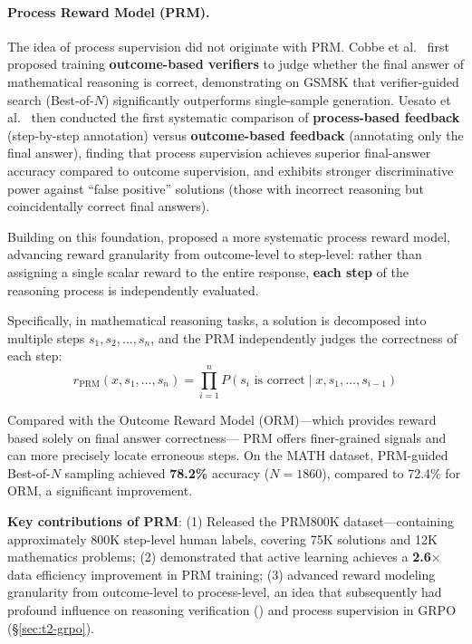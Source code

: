 \paragraph{Process Reward Model (PRM).}
The idea of process supervision did not originate with PRM.
Cobbe et al.\ \cite{cobbe2021gsm8k} first proposed training \textbf{outcome-based verifiers}
to judge whether the final answer of mathematical reasoning is correct, demonstrating on GSM8K that
verifier-guided search (Best-of-$N$) significantly outperforms single-sample generation.
Uesato et al.\ \cite{uesato2022process} then conducted the first systematic comparison of
\textbf{process-based feedback} (step-by-step annotation) versus \textbf{outcome-based feedback} (annotating only the final answer),
finding that process supervision achieves superior final-answer accuracy compared to outcome supervision,
and exhibits stronger discriminative power against ``false positive'' solutions (those with incorrect reasoning but coincidentally correct final answers).

Building on this foundation,  proposed a more systematic process reward model,
advancing reward granularity from outcome-level to step-level:
rather than assigning a single scalar reward to the entire response,
\textbf{each step} of the reasoning process is independently evaluated.

Specifically, in mathematical reasoning tasks,
a solution is decomposed into multiple steps $s_1, s_2, \ldots, s_n$,
and the PRM independently judges the correctness of each step:
\begin{equation}
\label{eq:pref:prm}
r_{\text{PRM}}(x, s_1, \ldots, s_n) = \prod_{i=1}^{n} P(s_i \text{ is correct} \mid x, s_1, \ldots, s_{i-1})
\end{equation}

Compared with the Outcome Reward Model (ORM)---which provides reward based solely on final answer correctness---
PRM offers finer-grained signals and can more precisely locate erroneous steps.
On the MATH dataset, PRM-guided Best-of-$N$ sampling achieved \textbf{78.2\%} accuracy ($N=1860$),
compared to 72.4\% for ORM, a significant improvement.

\begin{solutionbox}
\textbf{Key contributions of PRM}:
(1) Released the PRM800K dataset---containing approximately 800K step-level human labels,
covering 75K solutions and 12K mathematics problems;
(2) demonstrated that active learning achieves a \textbf{2.6$\times$} data efficiency improvement in PRM training;
(3) advanced reward modeling granularity from outcome-level to process-level,
an idea that subsequently had profound influence on reasoning verification () and
process supervision in GRPO (\S\ref{sec:t2-grpo}).
\end{solutionbox}

